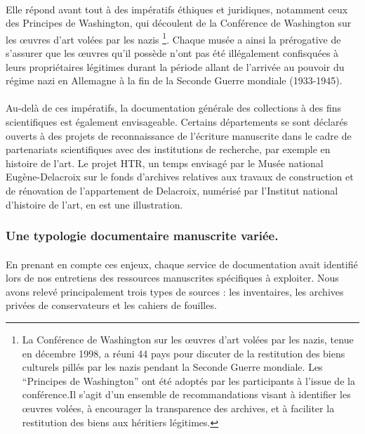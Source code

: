 \documentclass[a4paper,12pt,twoside]{book}
\begin{document}
\paragraph{}
Elle répond avant tout à des impératifs éthiques et juridiques, notamment ceux des Principes de Washington, qui découlent de la Conférence de Washington sur les œuvres d'art volées par les nazis \footnote{La Conférence de Washington sur les œuvres d'art volées par les nazis, tenue en décembre 1998, a réuni 44 pays pour discuter de la restitution des biens culturels pillés par les nazis pendant la Seconde Guerre mondiale. Les \enquote{Principes de Washington} ont été adoptés par les participants à l'issue de la conférence.Il s'agit d'un ensemble de recommandations visant à identifier les œuvres volées, à encourager la transparence des archives, et à faciliter la restitution des biens aux héritiers légitimes.}. Chaque musée a ainsi la prérogative de s'assurer que les œuvres qu'il possède n'ont pas été illégalement confisquées à leurs propriétaires légitimes durant la période allant de l'arrivée au pouvoir du régime nazi en Allemagne à la fin de la Seconde Guerre mondiale (1933-1945).

\paragraph{}
Au-delà de ces impératifs, la documentation générale des collections à des fins scientifiques est également envisageable. Certains départements se sont déclarés ouverts à des projets de reconnaissance de l’écriture manuscrite dans le cadre de partenariats scientifiques avec des institutions de recherche, par exemple en histoire de l’art. Le projet HTR, un temps envisagé par le Musée national Eugène-Delacroix sur le fonds d’archives relatives aux travaux de construction et de rénovation de l'appartement de Delacroix, numérisé par l’Institut national d’histoire de l’art, en est une illustration.

\subsubsection{Une typologie documentaire manuscrite variée.}
 
\paragraph{}
En prenant en compte ces enjeux, chaque service de documentation avait identifié lors de nos entretiens des ressources manuscrites spécifiques à exploiter. Nous avons relevé principalement trois types de sources : les inventaires, les archives privées de conservateurs et les cahiers de fouilles. 
\end{document}
